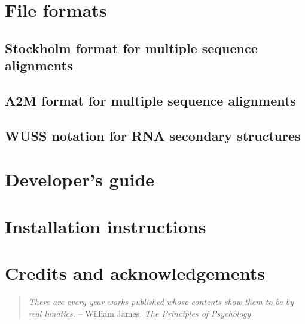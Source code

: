 \documentclass[10pt]{book}
\begin{document}
\chapter{File formats}

\section{Stockholm format for multiple sequence alignments}


\section{A2M format for multiple sequence alignments}



\newpage
\section{WUSS notation for RNA secondary structures}



\newpage
\chapter{Developer's guide}


\newpage
\chapter{Installation instructions}


\newpage
\chapter{Credits and acknowledgements}
\begin{quote}
\emph{There are every year works published whose contents show them to
  be by real lunatics.}
\hspace*{1em}\hfill -- William James, \emph{The Principles of Psychology}
\end{quote}

\newpage
\newcommand{\bibfont}{\footnotesize}


\end{document}
